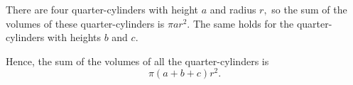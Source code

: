 

















There are four quarter-cylinders with height $a$ and radius $r,$ so the sum of the volumes of these quarter-cylinders is $\pi ar^2.$ The same holds for the quarter-cylinders with heights $b$ and $c.$

Hence, the sum of the volumes of all the quarter-cylinders is
$$\pi (a + b + c) r^2.$$

